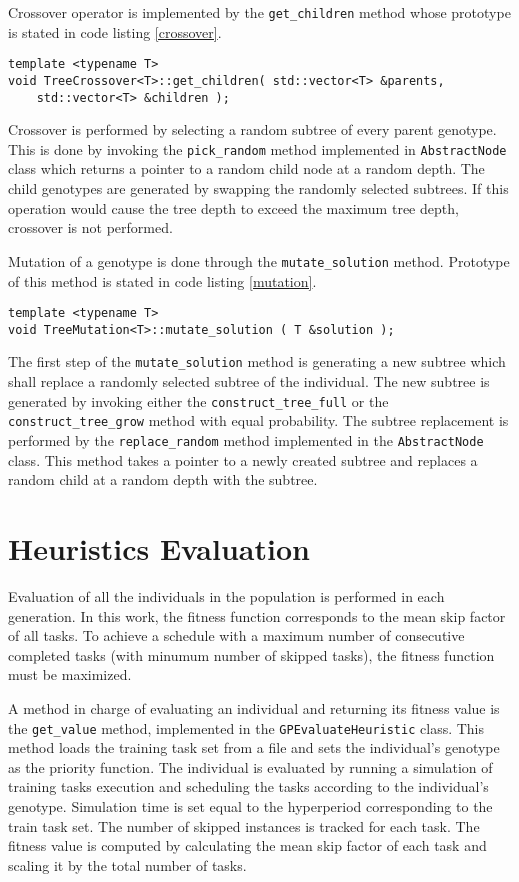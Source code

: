 Crossover operator is implemented by the \texttt{get\_children} method whose prototype is stated in code listing \ref{crossover}.
\begin{lstlisting}[frame=none, label={crossover}, caption={Prototype of the \texttt{get\_children} method which performs crossover.}, captionpos=b]
template <typename T>
void TreeCrossover<T>::get_children( std::vector<T> &parents, 
	std::vector<T> &children );
\end{lstlisting}
Crossover is performed by selecting a random subtree of every parent genotype.
This is done by invoking the \texttt{pick\_random} method implemented in \texttt{AbstractNode} class which returns a pointer to a random child node at a random depth.
The child genotypes are generated by swapping the randomly selected subtrees.
If this operation would cause the tree depth to exceed the maximum tree depth, crossover is not performed.

Mutation of a genotype is done through the \texttt{mutate\_solution} method.
Prototype of this method is stated in code listing \ref{mutation}.
\begin{lstlisting}[frame=none, label={mutation}, caption={Prototype of the \texttt{mutate\_solution} method.}, captionpos=b]
template <typename T>
void TreeMutation<T>::mutate_solution ( T &solution );
\end{lstlisting}
The first step of the \texttt{mutate\_solution} method is generating a new subtree which shall replace a randomly selected subtree of the individual.
The new subtree is generated by invoking either the \texttt{construct\_tree\_full} or the \texttt{construct\_tree\_grow} method with equal probability.
The subtree replacement is performed by the \texttt{replace\_random} method implemented in the \texttt{AbstractNode} class.
This method takes a pointer to a newly created subtree and replaces a random child at a random depth with the subtree.

\section{Heuristics Evaluation}
Evaluation of all the individuals in the population is performed in each generation.
In this work, the fitness function corresponds to the mean skip factor of all tasks.
To achieve a schedule with a maximum number of consecutive completed tasks (with minumum number of skipped tasks), the fitness function must be maximized.

A method in charge of evaluating an individual and returning its fitness value is the \texttt{get\_value} method, implemented in the \texttt{GPEvaluateHeuristic} class.
This method loads the training task set from a file and sets the individual's genotype as the priority function.
The individual is evaluated by running a simulation of training tasks execution and scheduling the tasks according to the individual's genotype.
Simulation time is set equal to the hyperperiod corresponding to the train task set.
The number of skipped instances is tracked for each task.
The fitness value is computed by calculating the mean skip factor of each task and scaling it by the total number of tasks.

